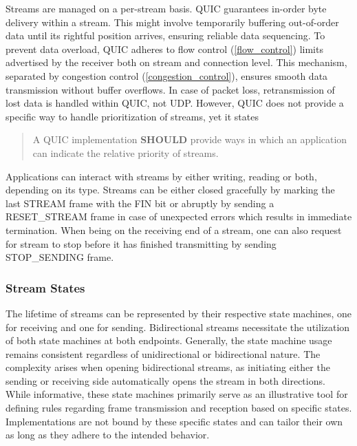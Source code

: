 Streams are managed on a per-stream basis. QUIC guarantees in-order byte delivery within a stream. This might involve temporarily buffering out-of-order data until its rightful position arrives, ensuring reliable data sequencing. To prevent data overload, QUIC adheres to flow control (\ref{flow_control}) limits advertised by the receiver both on stream and connection level. This mechanism, separated by congestion control (\ref{congestion_control}), ensures smooth data transmission without buffer overflows. In case of packet loss, retransmission of lost data is handled within QUIC, not UDP. However, QUIC does not provide a specific way to handle prioritization of streams, yet it states 
\begin{quote}
     A QUIC implementation \textbf{SHOULD} provide ways in which an application can indicate the relative priority of streams.\cite[14]{rfc9000}
\end{quote}

Applications can interact with streams by either writing, reading or both, depending on its type. Streams can be either closed gracefully by marking the last STREAM frame with the FIN bit or abruptly by sending a RESET\_STREAM frame in case of unexpected errors which results in immediate termination. When being on the receiving end of a stream, one can also request for stream to stop before it has finished transmitting by sending STOP\_SENDING frame.

\subsubsection{Stream States}

The lifetime of streams can be represented by their respective state machines, one for receiving and one for sending. Bidirectional streams necessitate the utilization of both state machines at both endpoints. Generally, the state machine usage remains consistent regardless of unidirectional or bidirectional nature. The complexity arises when opening bidirectional streams, as initiating either the sending or receiving side automatically opens the stream in both directions. While informative, these state machines primarily serve as an illustrative tool for defining rules regarding frame transmission and reception based on specific states. Implementations are not bound by these specific states and can tailor their own as long as they adhere to the intended behavior.

